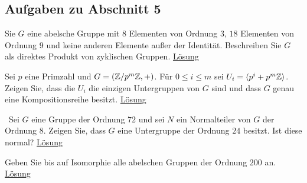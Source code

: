 \subsection{Aufgaben zu Abschnitt 5}

\begin{exe}\label{aufgabe:5.1}
	Sie $ G $ eine abelsche Gruppe mit $ 8 $ Elementen von Ordnung $ 3 $,
	$ 18 $ Elementen von Ordnung $ 9 $ und keine anderen Elemente außer der Identität.
	Beschreiben Sie $ G $ als direktes Produkt von zyklischen Gruppen.
	\hyperlink{loes:5.1}{Lösung}
\end{exe}

\begin{exe}\label{aufgabe:5.2}
	Sei $ p $ eine Primzahl und $ G = ( \mathbb{Z} / p^m \mathbb{Z},+) $.
	Für $ 0 \leq i \leq m $ sei $ U_i = \langle p^i + p^m \mathbb{Z} \rangle $.
	Zeigen Sie, dass die $ U_i $ die einzigen Untergruppen von $ G $ sind 
	und dass $ G $ genau eine Kompositionsreihe besitzt.
	\hyperlink{loes:5.2}{Lösung}
\end{exe}

\begin{exe}\label{aufgabe:5.3}\ 
	Sei $ G $ eine Gruppe der Ordnung $ 72 $ und sei $ N $ ein Normalteiler von $ G $
	der Ordnung $ 8 $.
	Zeigen Sie, dass $ G $ eine Untergruppe der Ordnung $ 24 $ besitzt.
	Ist diese normal?
	\hyperlink{loes:5.3}{Lösung}
\end{exe}

\begin{exe}\label{aufgabe:5.4}
	Geben Sie bis auf Isomorphie alle abelschen Gruppen der Ordnung $ 200 $ an.
	\hyperlink{loes:5.3}{Lösung}
\end{exe}

